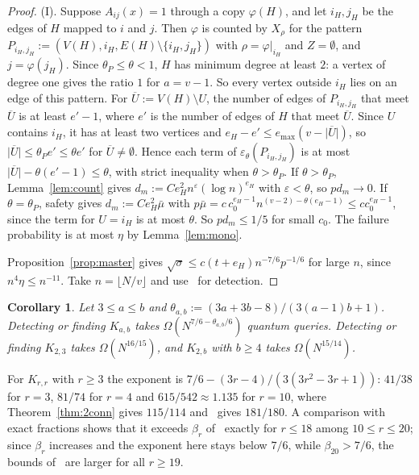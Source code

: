 \documentclass[11pt]{article}
\newtheorem{corollary}[theorem]{Corollary}
\theoremstyle{remark}
\newcommand{\abs}[1]{\lvert #1\rvert}
\begin{document}
\begin{proof}
(I). Suppose $A_{ij}(x)=1$ through a copy $\varphi(H)$, and let $i_H,j_H$ be the edges of $H$ mapped to $i$ and $j$. Then $\varphi$ is counted by $X_\rho$ for the pattern $P_{i_H,j_H}:=(V(H),i_H,E(H)\setminus\{i_H,j_H\})$ with $\rho=\varphi|_{i_H}$ and $Z=\emptyset$, and $j=\varphi(j_H)$. Since $\theta_P\le\theta<1$, $H$ has minimum degree at least $2$: a vertex of degree one gives the ratio $1$ for $a=v-1$. So every vertex outside $i_H$ lies on an edge of this pattern. For $\overline U:=V(H)\setminus U$, the number of edges of $P_{i_H,j_H}$ that meet $\overline U$ is at least $e'-1$, where $e'$ is the number of edges of $H$ that meet $\overline U$. Since $U$ contains $i_H$, it has at least two vertices and $e_H-e'\le e_{\max}(v-\abs{\overline U})$, so $\abs{\overline U}\le\theta_Pe'\le\theta e'$ for $\overline U\ne\emptyset$. Hence each term of $\varepsilon_\theta(P_{i_H,j_H})$ is at most $\abs{\overline U}-\theta(e'-1)\le\theta$, with strict inequality when $\theta>\theta_P$. If $\theta>\theta_P$, Lemma~\ref{lem:count} gives $d_m:=Ce_H^2n^\varepsilon(\log n)^{e_H}$ with $\varepsilon<\theta$, so $pd_m\to0$. If $\theta=\theta_P$, safety gives $d_m:=Ce_H^2\bar\mu$ with $p\bar\mu=c\,c_0^{e_H-1}n^{(v-2)-\theta(e_H-1)}\le cc_0^{e_H-1}$, since the term for $U=i_H$ is at most $\theta$. So $pd_m\le1/5$ for small $c_0$. The failure probability is at most $\eta$ by Lemma~\ref{lem:mono}.

Proposition~\ref{prop:master} gives $\sqrt\sigma\le c(t+e_H)n^{-7/6}p^{-1/6}$ for large $n$, since $n^4\eta\le n^{-11}$. Take $n=\lfloor N/v\rfloor$ and use~\cite[Lemma~23]{CGP26} for detection.
\end{proof}

\begin{corollary}\label{cor:kab}
Let $3\le a\le b$ and $\theta_{a,b}:=(3a+3b-8)/(3(a-1)b+1)$. Detecting or finding $K_{a,b}$ takes $\Omega(N^{7/6-\theta_{a,b}/6})$ quantum queries. Detecting or finding $K_{2,3}$ takes $\Omega(N^{16/15})$, and $K_{2,b}$ with $b\ge4$ takes $\Omega(N^{15/14})$.
\end{corollary}

For $K_{r,r}$ with $r\ge3$ the exponent is $7/6-(3r-4)/(3(3r^2-3r+1))$: $41/38$ for $r=3$, $81/74$ for $r=4$ and $615/542\approx1.135$ for $r=10$, where Theorem~\ref{thm:2conn} gives $115/114$ and~\cite{GZ26} gives $181/180$. A comparison with exact fractions shows that it exceeds $\beta_r$ of~\cite[(68)]{GZ26} exactly for $r\le18$ among $10\le r\le20$; since $\beta_r$ increases and the exponent here stays below $7/6$, while $\beta_{20}>7/6$, the bounds of~\cite{GZ26} are larger for all $r\ge19$.
\end{document}
